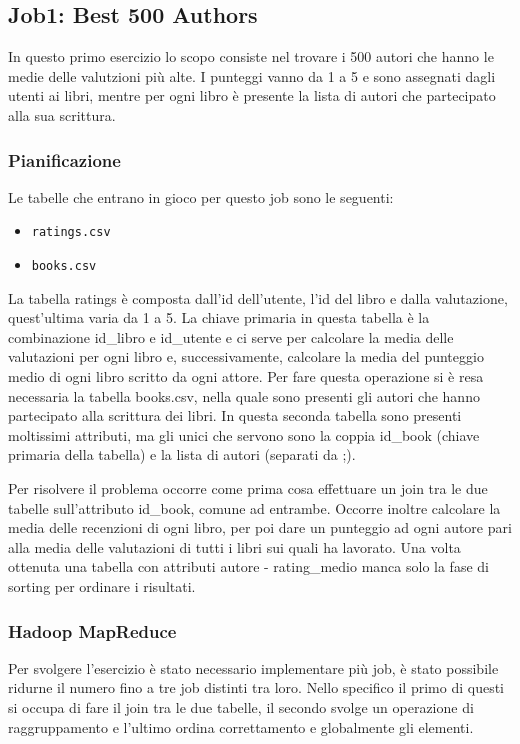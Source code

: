 \subsection{Job1: Best 500 Authors}

In questo primo esercizio lo scopo consiste nel trovare i 500 autori che hanno le medie delle valutzioni più alte.
I punteggi vanno da 1 a 5 e sono assegnati dagli utenti ai libri, mentre per ogni libro è presente la lista di autori che
partecipato alla sua scrittura.

\subsubsection{Pianificazione}
Le tabelle che entrano in gioco per questo job sono le seguenti:
\begin{itemize}
    \item \texttt{ratings.csv}
    \item \texttt{books.csv}
\end{itemize}

La tabella ratings è composta dall'id dell'utente, l'id del libro e dalla valutazione, quest'ultima varia da 1 a 5.
La chiave primaria in questa tabella è la combinazione id\_libro e id\_utente e ci serve per calcolare la media delle
valutazioni per ogni libro e, successivamente, calcolare la media del punteggio medio di ogni libro scritto da ogni attore.
Per fare questa operazione si è resa necessaria la tabella books.csv, nella quale sono presenti gli autori che hanno
partecipato alla scrittura dei libri.
In questa seconda tabella sono presenti moltissimi attributi, ma gli unici che servono sono la coppia id\_book
(chiave primaria della tabella) e la lista di autori (separati da ;).

Per risolvere il problema occorre come prima cosa effettuare un join tra le due tabelle sull'attributo id\_book, comune ad entrambe.
Occorre inoltre calcolare la media delle recenzioni di ogni libro, per poi dare un punteggio ad ogni autore pari alla media delle
valutazioni di tutti i libri sui quali ha lavorato.
Una volta ottenuta una tabella con attributi autore - rating\_medio manca solo la fase di sorting per ordinare i risultati.

\subsubsection{Hadoop MapReduce}
Per svolgere l'esercizio è stato necessario implementare più job, è stato possibile ridurne il numero fino a tre job distinti tra loro.
Nello specifico il primo di questi si occupa di fare il join tra le due tabelle, il secondo svolge un operazione di raggruppamento e l'ultimo
ordina correttamento e globalmente gli elementi.

